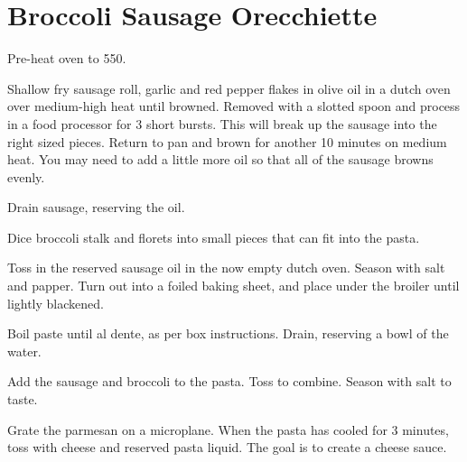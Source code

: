 \section{Broccoli Sausage Orecchiette}
\begin{recipe}



Pre-heat oven to 550\degree{}.

Shallow fry sausage roll, garlic and red pepper flakes in olive oil in a dutch oven over medium-high heat until
browned. Removed with a slotted spoon and process in a food processor for 3
short bursts. This will break up the sausage into the right sized pieces.
Return to pan and brown for another 10 minutes on medium heat. You may need to add a
little more oil so that all of the sausage browns evenly. 

Drain sausage, reserving the oil.


Dice broccoli stalk and florets into small pieces that can fit into the pasta. 

Toss in the reserved sausage oil in the now empty dutch oven. Season with salt and papper. 
Turn out into a foiled baking sheet, and place under the broiler until lightly blackened.


Boil paste until al dente, as per box instructions. Drain, reserving a bowl
of the water.

Add the sausage and broccoli to the pasta. Toss to combine.
Season with salt to taste. 


Grate the parmesan on a microplane. When the pasta has cooled for 3
minutes, toss with cheese and reserved pasta liquid. The goal is to create a
cheese sauce.


\end{recipe}

